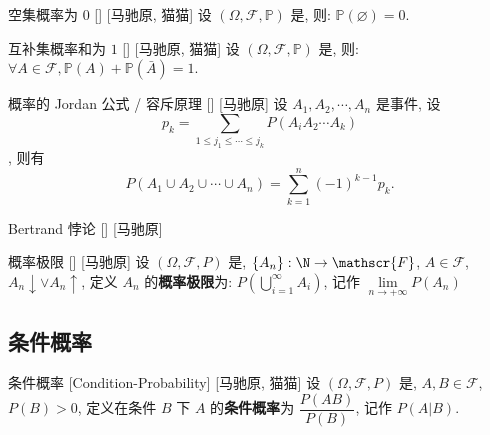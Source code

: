 \documentclass[UTF8]{ctexart}
\begin{document}
        \begin{ppt}
            []
            {空集概率为 \(0\)}
            []
            [马驰原, 猫猫]
            设 \((\Omega,\mathscr{F},\mathbb{P})\) 是, 则: \(\mathbb{P}(\varnothing)=0\). 
        \end{ppt}

        \begin{ppt}
            []
            {互补集概率和为 \(1\)}
            []
            [马驰原, 猫猫]
            设 \((\Omega,\mathscr{F},\mathbb{P})\) 是, 则: \(\forall A\in\mathscr{F}, \mathbb{P}(A)+\mathbb{P}(\bar{A})=1\). 
        \end{ppt}

        \begin{thm}
            []
            {概率的 Jordan 公式 / 容斥原理}
            []
            [马驰原]
            设 \(A_1,A_2,\cdots,A_n\) 是事件, 设\[p_k=\sum_{1\leq j_1\leq\cdots\leq j_k  }P(A_i A_2\cdots A_k)\], 则有
            \[P(A_1\cup A_2\cup\cdots\cup A_n)=\sum_{k=1}^{n}(-1)^{k-1}p_k.\]
        \end{thm}

        \begin{cxmp}
            []
            {Bertrand 悖论}
            []
            [马驰原]
        \end{cxmp}

        \begin{dfn}
            []
            {概率极限}
            []
            [马驰原]
            设 \((\Omega,\mathscr{F},P)\) 是, \(\{A_n\}:\N\to\mathscr{F}\), \(A\in\mathscr{F}\), \(A_n\downarrow\lor A_n\uparrow\), 定义 \(A_n\) 的\textbf{概率极限}为: \(P\left(\bigcup\limits_{i=1}^{\infty}A_i\right)\), 记作 \(\lim\limits_{n\to+\infty}P(A_n)\)
        \end{dfn}
        

    \subsection{条件概率}

        \begin{dfn}
            {条件概率}
            [Condition-Probability]
            [马驰原, 猫猫]
            设 \((\Omega,\mathscr{F},P)\) 是, \(A, B\in\mathscr{F}\), \(P(B)>0\), 定义在条件 \(B\) 下 \(A\) 的\textbf{条件概率}为 \(\dfrac{P(AB)}{P(B)}\), 记作 \(P(A|B)\). 
        \end{dfn}
\end{document}
